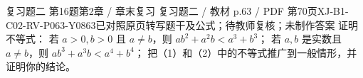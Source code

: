 \par\noindent\begin{minipage}{\linewidth}
\begin{bankitem}{复习题二 第16题}{第2章 / 章末复习 复习题二 / 教材 p.63 / PDF 第70页}{XJ-B1-C02-RV-P063-Y0863}{已对照原页转写题干及公式；待教师复核；未制作答案}
证明不等式：
若 $a>0,b>0$ 且 $a\ne b$，则 $ab^2+a^2b<a^3+b^3$；
若 $a,b$ 是实数且 $a\ne b$，则 $ab^3+a^3b<a^4+b^4$；
把（1）和（2）中的不等式推广到一般情形，并证明你的结论。
\end{bankitem}
\end{minipage}\par\medskip

